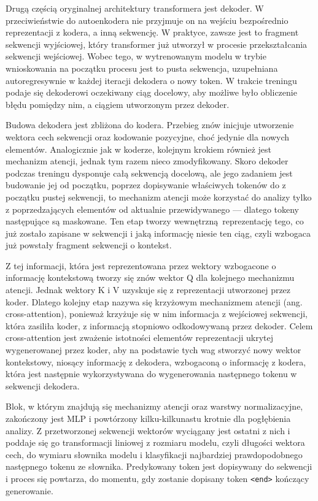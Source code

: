 Drugą częścią oryginalnej architektury transformera jest dekoder. W przeciwieństwie do autoenkodera nie przyjmuje on na wejściu bezpośrednio reprezentacji z kodera, a inną sekwencję. W praktyce, zawsze jest to fragment sekwencji wyjściowej, który transformer już utworzył w procesie przekształcania sekwencji wejściowej. Wobec tego, w wytrenowanym modelu w trybie wnioskowania na początku procesu jest to pusta sekwencja, uzupełniana autoregresywnie w każdej iteracji dekodera o nowy token. W trakcie treningu podaje się dekoderowi oczekiwany ciąg docelowy, aby możliwe było obliczenie błędu pomiędzy nim, a ciągiem utworzonym przez dekoder.

Budowa dekodera jest zbliżona do kodera. Przebieg znów inicjuje utworzenie wektora cech sekwencji oraz kodowanie pozycyjne, choć jedynie dla nowych elementów. Analogicznie jak w koderze, kolejnym krokiem również jest mechanizm atencji, jednak tym razem nieco zmodyfikowany. Skoro dekoder podczas treningu dysponuje całą sekwencją docelową, ale jego zadaniem jest budowanie jej od początku, poprzez dopisywanie właściwych tokenów do z początku pustej sekwencji, to mechanizm atencji może korzystać do analizy tylko z poprzedzających elementów od aktualnie przewidywanego --- dlatego tokeny następujące są maskowane. Ten etap tworzy wewnętrzną reprezentację tego, co już zostało zapisane w sekwencji i jaką informację niesie ten ciąg, czyli wzbogaca już powstały fragment sekwencji o kontekst.

Z tej informacji, która jest reprezentowana przez wektory wzbogacone o informację kontekstową tworzy się znów wektor Q dla kolejnego mechanizmu atencji. Jednak wektory K i V uzyskuje się z reprezentacji utworzonej przez koder. Dlatego kolejny etap nazywa się krzyżowym mechanizmem atencji (ang. cross-attention), ponieważ krzyżuje się w nim informacja z wejściowej sekwencji, która zasiliła koder, z informacją stopniowo odkodowywaną przez dekoder. Celem cross-attention jest zważenie istotności elementów reprezentacji ukrytej wygenerowanej przez koder, aby na podstawie tych wag stworzyć nowy wektor kontekstowy, niosący informację z dekodera, wzbogaconą o informację z kodera, która jest następnie wykorzystywana do wygenerowania następnego tokenu w sekwencji dekodera.

\begin{sloppypar}
	Blok, w którym znajdują się mechanizmy atencji oraz warstwy normalizacyjne, za\-koń\-czo\-ny jest MLP i powtórzony kilku-kilkunastu krotnie dla pogłębienia analizy. Z przetworzonej sekwencji wektorów wyciągany jest ostatni z nich i poddaje się go transformacji liniowej z rozmiaru modelu, czyli długości wektora cech, do wymiaru słownika modelu i klasyfikacji najbardziej prawdopodobnego następnego tokenu ze słownika. Predykowany token jest dopisywany do sekwencji i proces się powtarza, do momentu, gdy zostanie dopisany token \texttt{<end>} kończący generowanie.
\end{sloppypar}

